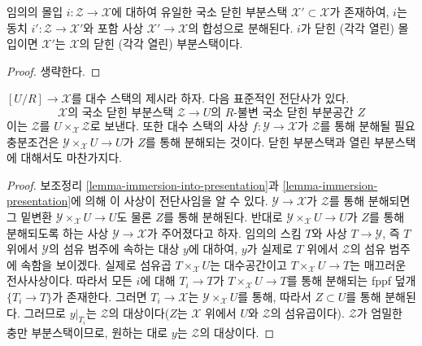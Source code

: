 \begin{lemma}
\label{lemma-substack-image}
임의의 몰입 $i : \mathcal{Z} \to \mathcal{X}$에 대하여 유일한 국소 닫힌
부분스택 $\mathcal{X}' \subset \mathcal{X}$가 존재하여, $i$는 동치
$i' : \mathcal{Z} \to \mathcal{X}'$와 포함 사상
$\mathcal{X}' \to \mathcal{X}$의 합성으로 분해된다.
$i$가 닫힌 (각각 열린) 몰입이면 $\mathcal{X}'$는
$\mathcal{X}$의 닫힌 (각각 열린) 부분스택이다.
\end{lemma}

\begin{proof}
생략한다.
\end{proof}

\begin{lemma}
\label{lemma-substacks-presentation}
$[U/R] \to \mathcal{X}$를 대수 스택의 제시라 하자. 다음 표준적인 전단사가 있다.
$$
\mathcal{X}\text{의 국소 닫힌 부분스택 }\mathcal{Z}
\longrightarrow
U\text{의 }R\text{-불변 국소 닫힌 부분공간 }Z
$$
이는 $\mathcal{Z}$를 $U \times_\mathcal{X} \mathcal{Z}$로 보낸다.
또한 대수 스택의 사상 $f : \mathcal{Y} \to \mathcal{X}$가
$\mathcal{Z}$를 통해 분해될 필요충분조건은
$\mathcal{Y} \times_\mathcal{X} U \to U$가 $Z$를 통해 분해되는 것이다.
닫힌 부분스택과 열린 부분스택에 대해서도 마찬가지다.
\end{lemma}

\begin{proof}
보조정리 \ref{lemma-immersion-into-presentation}과
\ref{lemma-immersion-presentation}에 의해 이 사상이 전단사임을 알 수 있다.
$\mathcal{Y} \to \mathcal{X}$가 $\mathcal{Z}$를 통해 분해되면 그 밑변환
$\mathcal{Y} \times_\mathcal{X} U \to U$도 물론 $Z$를 통해 분해된다.
반대로 $\mathcal{Y} \times_\mathcal{X} U \to U$가 $Z$를 통해 분해되도록 하는
사상 $\mathcal{Y} \to \mathcal{X}$가 주어졌다고 하자.
임의의 스킴 $T$와 사상 $T \to \mathcal{Y}$, 즉 $T$ 위에서
$\mathcal{Y}$의 섬유 범주에 속하는 대상 $y$에 대하여, $y$가 실제로
$T$ 위에서 $\mathcal{Z}$의 섬유 범주에 속함을 보이겠다.
실제로 섬유곱 $T \times_\mathcal{X} U$는 대수공간이고
$T \times_\mathcal{X} U \to T$는 매끄러운 전사사상이다.
따라서 모든 $i$에 대해 $T_i \to T$가
$T \times_\mathcal{X} U \to T$를 통해 분해되는 fppf 덮개
$\{T_i \to T\}$가 존재한다.
그러면 $T_i \to \mathcal{X}$는 $\mathcal{Y} \times_\mathcal{X} U$를 통해,
따라서 $Z \subset U$를 통해 분해된다. 그러므로 $y|_{T_i}$는
$\mathcal{Z}$의 대상이다($Z$는 $\mathcal{X}$ 위에서 $U$와
$\mathcal{Z}$의 섬유곱이다). $\mathcal{Z}$가 엄밀한 충만 부분스택이므로,
원하는 대로 $y$는 $\mathcal{Z}$의 대상이다.
\end{proof}

